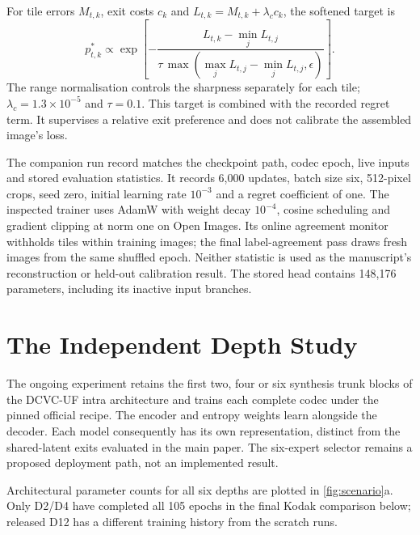 For tile errors $M_{t,k}$, exit costs $c_k$ and
$L_{t,k}=M_{t,k}+\lambda_c c_k$, the softened target is
\begin{equation}
 p^*_{t,k}\propto\exp\!\left[-\frac{L_{t,k}-\min_j L_{t,j}}
 {\tau\,\max(\max_j L_{t,j}-\min_j L_{t,j},\epsilon)}\right].
 \label{eq:softtarget}
\end{equation}
The range normalisation controls the sharpness separately for each tile;
$\lambda_c=1.3\times10^{-5}$ and $\tau=0.1$. This target is combined with
the recorded regret term. It supervises a relative exit preference and
does not calibrate the assembled image's loss.

The companion run record matches the checkpoint path, codec epoch, live
inputs and stored evaluation statistics. It records 6,000 updates, batch
size six, 512-pixel crops, seed zero, initial learning rate $10^{-3}$ and a
regret coefficient of one. The inspected trainer uses AdamW with weight
decay $10^{-4}$, cosine scheduling and gradient clipping at norm one on
Open Images. Its online agreement monitor withholds tiles within training
images; the final label-agreement pass draws fresh images from the same
shuffled epoch. Neither statistic is used as the manuscript's reconstruction
or held-out calibration result. The stored head contains 148,176 parameters,
including its inactive input branches.

\section{The Independent Depth Study}

The ongoing experiment retains the first two, four or six synthesis trunk
blocks of the DCVC-UF intra architecture and trains each complete codec
under the pinned official recipe. The encoder and entropy weights learn
alongside the decoder. Each model consequently has its own representation,
distinct from the shared-latent exits evaluated in the main paper.
The six-expert selector remains a proposed deployment path, not an
implemented result.

Architectural parameter counts for all six depths are plotted in
\cref{fig:scenario}a. Only D2/D4 have completed all 105 epochs in the
final Kodak comparison below; released D12 has a different training
history from the scratch runs.

